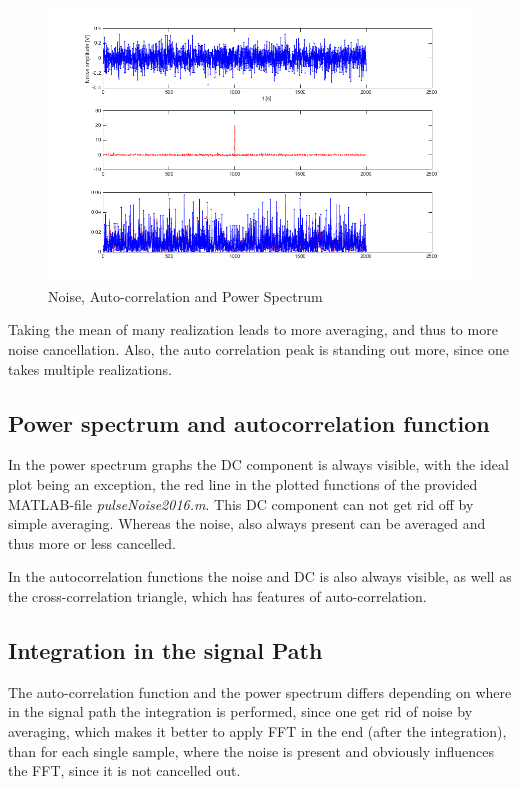 \documentclass[12pt]{article}
\begin{document}
\begin{figure}[h!]
	\centering
	\includegraphics[width=\linewidth]{images/ass1_12}	
	\caption{Noise, Auto-correlation and Power Spectrum}
	\label{fig:12_1}
\end{figure}

Taking the mean of many realization leads to more averaging, and thus to more noise cancellation. Also, the auto correlation peak is standing out more, since one takes multiple realizations.

\subsection{Power spectrum and autocorrelation function}

In the power spectrum graphs the DC component is always visible, with the ideal plot being an exception, the red line in the plotted functions of the provided MATLAB-file \textit{pulseNoise2016.m}. This DC component can not get rid off by simple averaging. Whereas the noise, also always present can be averaged and thus more or less cancelled.

In the autocorrelation functions the noise and DC is also always visible, as well as the cross-correlation triangle, which has features of auto-correlation.


\subsection{Integration in the signal Path}
The auto-correlation function and the power spectrum differs depending on where in the signal path the integration is performed, since one get rid of noise by averaging, which makes it better to apply FFT in the end (after the integration), than for each single sample, where the noise is present and obviously influences the FFT, since it is not cancelled out.
\end{document}
